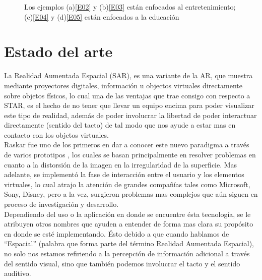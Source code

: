 \documentclass[a4paper,openright,12pt]{report}
\begin{document}
\begin{figure}[t]
	\centering
	\caption[Ejemplos de AR en smartphones y tablets]{Los ejemplos (a)\hyperlink{e02}{[E02]} y (b)\hyperlink{e03}{[E03]} están enfocados al entretenimiento; (c)\hyperlink{e04}{[E04]} y (d)\hyperlink{e05}{[E05]} están enfocados a la educación} \label{fig:ARejemplos}
\end{figure}

\section{Estado del arte}
La Realidad Aumentada Espacial (SAR), es una variante de la AR, que muestra mediante proyectores digitales, información u objectos virtuales directamente sobre objetos físicos, lo cual una de las ventajas que trae consigo con respecto a STAR, es el hecho de no tener que llevar un equipo encima para poder visualizar este tipo de realidad, además de poder involucrar la libertad de poder interactuar directamente (sentido del tacto) de tal modo que nos ayude a estar mas en contacto con los objetos virtuales.\\
Raskar fue uno de los primeros en dar a conocer este nuevo paradigma a través de varios prototipos \citep{Raskar1998a,Raskar1998b,Raskar2001}, los cuales se basan principalmente en resolver problemas en cuanto a la distorsión de la imagen en la irregularidad de la superficie. Mas adelante, se implementó la fase de interacción entre el usuario y los elementos virtuales, lo cual atrajo la atención de grandes compañías tales como Microsoft\textregistered, Sony\textregistered, Disney\textregistered, pero a la vez, surgieron problemas mas complejos que aún siguen en proceso de investigación y desarrollo.\\ 
Dependiendo del uso o la aplicación en donde se encuentre ésta tecnología, se le atribuyen otros nombres que ayuden a entender de forma mas clara su propósito en donde se esté implementando. Ésto debido a que cuando hablamos de ``Espacial'' (palabra que forma parte del término Realidad Aumentada Espacial), no solo nos estamos refiriendo a la percepción de información adicional a través del sentido visual, sino que también podemos involucrar el tacto y el sentido auditivo.\\ 
\end{document}

